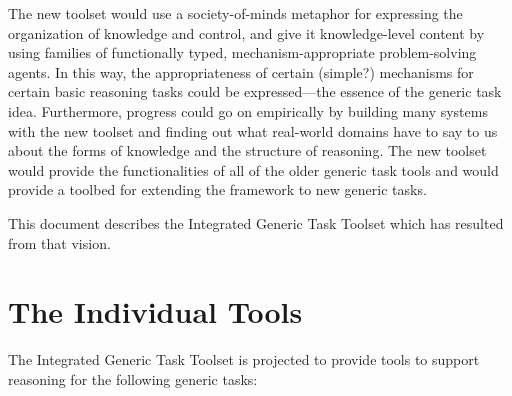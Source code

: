 The new toolset would use a society-of-minds metaphor
\cite{MINSKY-SOCIETY-79,MINSKY-SOCIETY-86} for expressing the
organization of knowledge and control, and give it knowledge-level
content by using families of functionally typed, mechanism-appropriate
problem-solving agents.  In this way, the appropriateness of certain
(simple?) mechanisms for certain basic reasoning tasks could be
expressed---the essence of the generic task idea.  Furthermore,
progress could go on empirically by building many systems with the new
toolset and finding out what real-world domains have to say to us
about the forms of knowledge and the structure of reasoning.  The new
toolset would provide the functionalities of all of the older generic
task tools and would provide a toolbed for extending the framework to
new generic tasks.

This document describes the Integrated Generic Task Toolset which has
resulted from that vision.






\section{The Individual Tools}

The Integrated Generic Task Toolset is projected to provide tools to
support reasoning for the following generic tasks:

